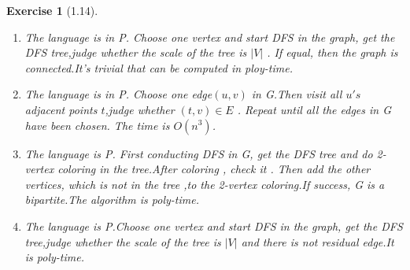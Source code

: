 \documentclass[a4paper]{article}
\newtheorem*{exercise}{Exercise}
\begin{document}
\begin{exercise}[1.14]
\begin{enumerate}		
	\item[\textbf{(a)}] 
		The language is in P.
		Choose one vertex and start DFS in the graph, get the DFS tree,judge whether the scale of the tree is $|V|$ . If equal, then the graph is connected.It's trivial that can be computed in ploy-time.
		\item[\textbf{(b)}] 
		The language is in P.
		Choose one edge$(u,v)$ in G.Then visit all $u's$ adjacent points $t$,judge whether $(t,v)\in E$ . Repeat until all the edges in G have been chosen. The time is $O(n^3)$.
		\item[\textbf{(c)}] 
		The language is P.
		First conducting DFS in G, get the DFS tree and do 2-vertex coloring in the tree.After coloring , check it .
		Then add the other vertices, which is not in the tree ,to the 2-vertex coloring.If success, G is a bipartite.The algorithm is poly-time.
		\item[\textbf{(d)}] 
		The language is P.Choose one vertex and start DFS in the graph, get the DFS tree,judge whether the scale of the tree is $|V|$ and there is not residual edge.It is poly-time.
\end{enumerate}
\end{exercise}
\end{document}
